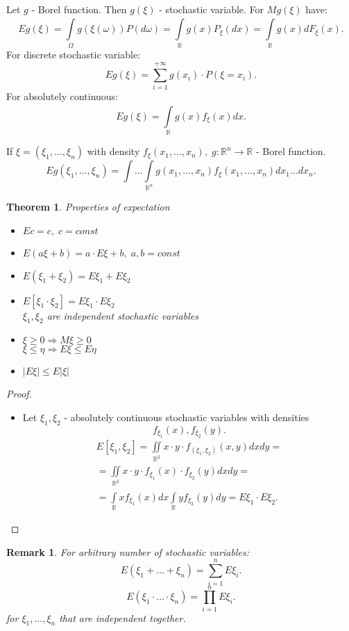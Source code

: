 \documentclass[12pt,letterpaper]{report}
\newtheorem{theorem}{Theorem}[section]
\newtheorem*{remark}{Remark}
\begin{document}
Let $g$ - Borel function. Then $g(\xi)$ - stochastic variable. For $Mg(\xi)$ have:
\[
    Eg(\xi) = \int\limits_{\Omega}^{} g(\xi(\omega)) P(d\omega) = \int\limits_{\mathbb{R}}^{} g(x) P_{\xi} (dx) = \int\limits_{\mathbb{R}}^{} g(x) dF_{\xi} (x) 
.\] 
For discrete stochastic variable:
\[
    Eg(\xi) = \sum_{i=1}^{+\infty} g(x_i) \cdot P(\xi = x_i)
.\] 
For absolutely continuous:
\[
    Eg(\xi) = \int\limits_{\mathbb{R}}^{} g(x) f_{\xi}(x)dx
.\] 

If $\xi = (\xi_1, \dots, \xi_n)$ with density $f_{\xi}(x_1, \dots, x_n), \; g : \mathbb{R}^{n} \to \mathbb{R} $ - Borel function.
\[
    Eg(\xi_1, \dots, \xi_n) = \int \dots \int\limits_{\mathbb{R}^n} g(x_1, \dots, x_n) f_{\xi}(x_1, \dots, x_n) dx_1 \dots dx_n
.\] 

\begin{theorem} Properties of expectation \\

    \begin{itemize}
        \item[1.] $ Ec = c, \; c = const $
    \item[2.] $ E(a\xi + b) = a \cdot E\xi + b, \; a,b = const $
    \item[3.] $ E(\xi_1 + \xi_2) = E\xi_1 + E\xi_2 $
    \item[4.] $ E[\xi_1 \cdot \xi_2] = E\xi_1 \cdot E\xi_2 $ \\
        $\xi_1, \xi_2$ are independent stochastic variables 
    \item[5.] $\xi \geq 0 \Rightarrow M\xi \geq 0$ \\
        $ \xi \leq \eta \Rightarrow E\xi \leq E\eta $
    \item [6.] $ |E\xi| \leq E|\xi| $
    \end{itemize}
\end{theorem}
\begin{proof}
    \begin{itemize}
        \item[4.] Let $\xi_1, \xi_2$ - absolutely continuous stochastic variables with densities
            \[
                f_{\xi_1}(x), f_{\xi_2}(y)
            .\] 
            \begin{align*}
                E[\xi_1, \xi_2] = \iint\limits_{\mathbb{R}^2} x \cdot y \cdot f_{(\xi_1,\xi_2)}(x,y)dx dy = \\
                = \iint\limits_{\mathbb{R}^2} x \cdot y \cdot f_{\xi_1}(x) \cdot f_{\xi_2}(y) dx dy = \\
                = \int\limits_{\mathbb{R}}^{} x f_{\xi_1}(x)dx \int\limits_{\mathbb{R}}^{} y f_{\xi_2}(y) dy = E\xi_1 \cdot E\xi_2
            .\end{align*}
    \end{itemize}
\end{proof}
\begin{remark}
    For arbitrary number of stochastic variables:
    \[
        E(\xi_1 + \dots + \xi_n) = \sum_{i=1}^{n} E\xi_i
    .\] 
    \[
        E(\xi_1 \cdot \dots \cdot \xi_n) = \prod_{i=1}^{n} E\xi_i 
    .\] 
    for $\xi_1, \dots, \xi_n$ that are independent together.
\end{remark}
\end{document}

